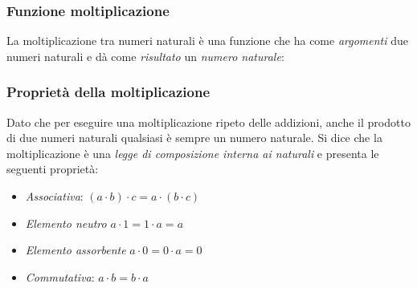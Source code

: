 \subsubsection{Funzione moltiplicazione}

La moltiplicazione tra numeri naturali è una funzione che ha come 
\emph{argomenti} due numeri naturali 
e dà come \emph{risultato} un \emph{numero naturale}:

\vspace{.5em}

% 

\subsubsection{Proprietà della moltiplicazione}

Dato che per eseguire una moltiplicazione ripeto delle addizioni, 
anche il prodotto di due numeri  naturali qualsiasi è sempre un numero 
naturale. 
Si dice che la moltiplicazione è una \emph{legge di composizione interna 
ai naturali} e presenta le seguenti 
proprietà:

\begin{itemize} [noitemsep]
 \item \emph{Associativa}: \((a \cdot b) \cdot c = a \cdot (b \cdot c)\)
 \item \emph{Elemento neutro} \(a \cdot 1 = 1 \cdot a = a\)
 \item \emph{Elemento assorbente} \(a \cdot 0 = 0 \cdot a = 0\)
 \item \emph{Commutativa}: \(a \cdot b = b \cdot a\)
\end{itemize}

